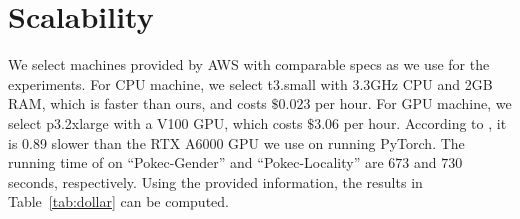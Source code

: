 



\section{Scalability} \label{ssec:dollar}
We select machines provided by AWS with comparable specs as we use for the experiments.
For CPU machine, we select t3.small with 3.3GHz CPU and 2GB RAM, which is faster than ours, and costs $\$0.023$ per hour.
For GPU machine, we select p3.2xlarge with a V100 GPU, which costs $\$3.06$ per hour.
According to \cite{NVIDIA}, it is 0.89 slower than the RTX A6000 GPU we use on running PyTorch.
The running time of \gcn on ``Pokec-Gender'' and ``Pokec-Locality'' are $673$ and $730$ seconds, respectively.
Using the provided information, the results in Table~\ref{tab:dollar} can be computed.